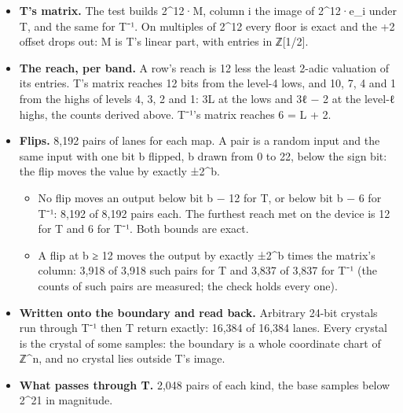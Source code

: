 \begin{itemize}
\item \textbf{T's matrix.} The test builds 2\textasciicircum{}12·M, column i the image of 2\textasciicircum{}12·e\_\allowbreak{}i under T, and the same for T⁻¹. On multiples of 2\textasciicircum{}12 every floor is exact and the +2 offset drops out: M is T's linear part, with entries in ℤ[1/2].
\item \textbf{The reach, per band.} A row's reach is 12 less the least 2-adic valuation of its entries. T's matrix reaches 12 bits from the level-4 lows, and 10, 7, 4 and 1 from the highs of levels 4, 3, 2 and 1: 3L at the lows and 3ℓ − 2 at the level-ℓ highs, the counts derived above. T⁻¹'s matrix reaches 6 = L + 2.
\item \textbf{Flips.} 8,192 pairs of lanes for each map. A pair is a random input and the same input with one bit b flipped, b drawn from 0 to 22, below the sign bit: the flip moves the value by exactly ±2\textasciicircum{}b.

\begin{itemize}
\item No flip moves an output below bit b − 12 for T, or below bit b − 6 for T⁻¹: 8,192 of 8,192 pairs each. The furthest reach met on the device is 12 for T and 6 for T⁻¹. Both bounds are exact.
\item A flip at b ≥ 12 moves the output by exactly ±2\textasciicircum{}b times the matrix's column: 3,918 of 3,918 such pairs for T and 3,837 of 3,837 for T⁻¹ (the counts of such pairs are measured; the check holds every one).
\end{itemize}
\item \textbf{Written onto the boundary and read back.} Arbitrary 24-bit crystals run through T⁻¹ then T return exactly: 16,384 of 16,384 lanes. Every crystal is the crystal of some samples: the boundary is a whole coordinate chart of ℤ\textasciicircum{}n, and no crystal lies outside T's image.
\item \textbf{What passes through T.} 2,048 pairs of each kind, the base samples below 2\textasciicircum{}21 in magnitude.


\end{itemize}
